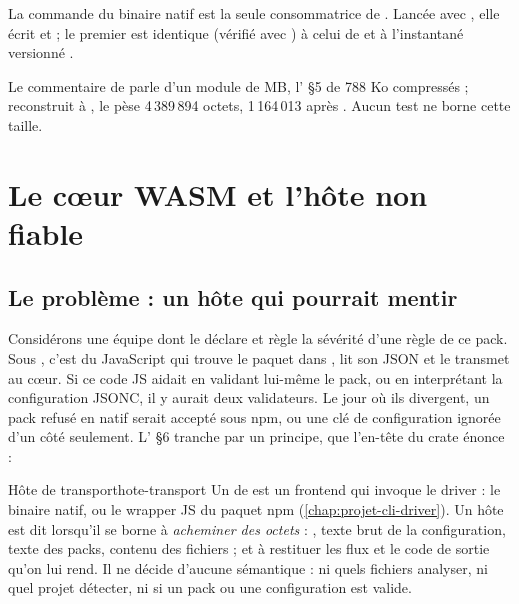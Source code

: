 La commande  du binaire natif est la seule consommatrice de . Lancée avec , elle écrit  et  ; le premier est identique (vérifié avec ) à celui de  et à l'instantané versionné .

\begin{remarque}
Le commentaire de  parle d'un module de  MB\fg{}, l' §5 de 788 Ko compressés ; reconstruit à , le  pèse 4\,389\,894 octets, 1\,164\,013 après . Aucun test ne borne cette taille.
\end{remarque}

\section{Le cœur WASM et l'hôte non fiable}
\label{sec:distribution-wasm}

\subsection{Le problème : un hôte qui pourrait mentir}

Considérons une équipe dont le  déclare  et règle la sévérité d'une règle de ce pack. Sous , c'est du JavaScript qui trouve le paquet  dans , lit son JSON et le transmet au cœur. Si ce code JS \og aidait\fg{} en validant lui-même le pack, ou en interprétant la configuration JSONC, il y aurait deux validateurs. Le jour où ils divergent, un pack refusé en natif serait accepté sous npm, ou une clé de configuration ignorée d'un côté seulement. L' §6 tranche par un principe, que l'en-tête du crate énonce :


\begin{definition}{Hôte de transport}{hote-transport}
Un  de \reactant{} est un frontend qui invoque le driver : le binaire natif, ou le wrapper JS du paquet npm (\cref{chap:projet-cli-driver}). Un hôte est dit  lorsqu'il se borne à \emph{acheminer des octets} : , texte brut de la configuration, texte des packs, contenu des fichiers ; et à restituer les flux et le code de sortie qu'on lui rend. Il ne décide d'aucune sémantique : ni quels fichiers analyser, ni quel projet détecter, ni si un pack ou une configuration est valide.
\end{definition}

